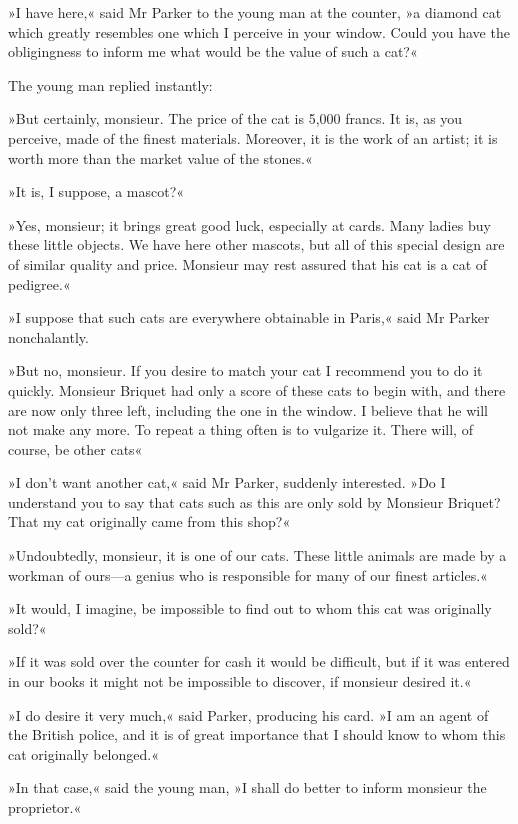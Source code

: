 »I have here,« said Mr Parker to the young man at the counter, »a diamond cat which greatly resembles one which I perceive in your window. Could you have the obligingness to inform me what would be the value of such a cat?«

The young man replied instantly:

»But certainly, monsieur. The price of the cat is 5,000 francs. It is, as you perceive, made of the finest materials. Moreover, it is the work of an artist; it is worth more than the market value of the stones.«

»It is, I suppose, a mascot?«

»Yes, monsieur; it brings great good luck, especially at cards. Many ladies buy these little objects. We have here other mascots, but all of this special design are of similar quality and price. Monsieur may rest assured that his cat is a cat of pedigree.«

»I suppose that such cats are everywhere obtainable in Paris,« said Mr  Parker nonchalantly.

»But no, monsieur. If you desire to match your cat I recommend you to do it quickly. Monsieur Briquet had only a score of these cats to begin with, and there are now only three left, including the one in the window. I believe that he will not make any more. To repeat a thing often is to vulgarize it. There will, of course, be other cats\longdash«

»I don't want another cat,« said Mr Parker, suddenly interested. »Do I understand you to say that cats such as this are only sold by Monsieur Briquet? That my cat originally came from this shop?«

»Undoubtedly, monsieur, it is one of our cats. These little animals are made by a workman of ours—a genius who is responsible for many of our finest articles.«

»It would, I imagine, be impossible to find out to whom this cat was originally sold?«

»If it was sold over the counter for cash it would be difficult, but if it was entered in our books it might not be impossible to discover, if monsieur desired it.«

»I do desire it very much,« said Parker, producing his card. »I am an agent of the British police, and it is of great importance that I should know to whom this cat originally belonged.«

»In that case,« said the young man, »I shall do better to inform monsieur the proprietor.«

